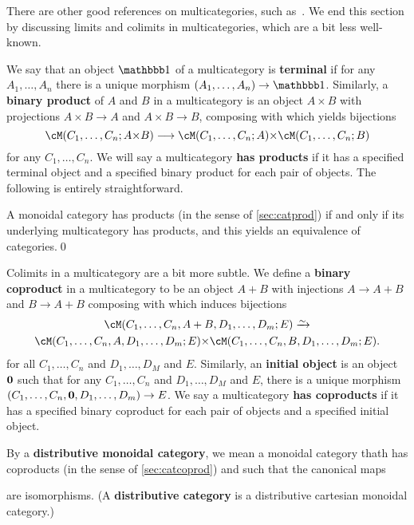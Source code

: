 There are other good references on multicategories, such as~\cite{hermida:multicats,leinster:higher-opds}.
We end this section by discussing limits and colimits in multicategories, which are a bit less well-known.


We say that an object $\unit$ of a multicategory is \textbf{terminal} if for any $A_1,\dots, A_n$ there is a unique morphism $(A_1,\dots, A_n)\to \unit$.
Similarly, a \textbf{binary product} of $A$ and $B$ in a multicategory is an object $A\times B$ with projections $A\times B \to A$ and $A\times B\to B$, composing with which yields bijections
\[ \cM(C_1,\dots,C_n;A\times B) \too \cM(C_1,\dots,C_n;A) \times \cM(C_1,\dots,C_n;B)\]
for any $C_1,\dots,C_n$.
We will say a multicategory \textbf{has products} if it has a specified terminal object and a specified binary product for each pair of objects.
The following is entirely straightforward.

\begin{thm}\label{thm:multicat-prod}
  A monoidal category has products (in the sense of \cref{sec:catprod}) if and only if its underlying multicategory has products, and this yields an equivalence of categories.\qed
\end{thm}

Colimits in a multicategory are a bit more subtle.
We define a \textbf{binary coproduct} in a multicategory \cM to be an object $A+B$ with injections $A\to A+B$ and $B\to A+B$ composing with which induces bijections
\begin{multline*}
  \cM(C_1,\dots,C_n,A+B,D_1,\dots,D_m;E) \toiso\\
  \cM(C_1,\dots,C_n,A,D_1,\dots,D_m;E) \times \cM(C_1,\dots,C_n,B,D_1,\dots,D_m;E).
\end{multline*}
for all $C_1,\dots,C_n$ and $D_1,\dots, D_M$ and $E$.
Similarly, an \textbf{initial object} is an object $\mathbf{0}$ such that for any $C_1,\dots,C_n$ and $D_1,\dots, D_M$ and $E$, there is a unique morphism $(C_1,\dots,C_n,\mathbf{0},D_1,\dots,D_m)\to E$.
We say a multicategory \textbf{has coproducts} if it has a specified binary coproduct for each pair of objects and a specified initial object.

By a \textbf{distributive monoidal category}, we mean a monoidal category thath has coproducts (in the sense of \cref{sec:catcoprod}) and such that the canonical maps
are isomorphisms.
(A \textbf{distributive category} is a distributive cartesian monoidal category.)

